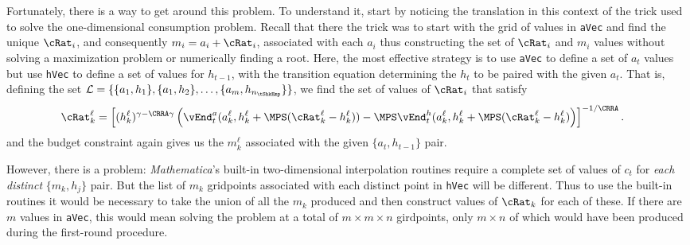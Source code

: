 \documentclass[titlepage]{\econtex}
\newcommand{\Mma}{\textit{Mathematica}}
\begin{document}
{  Fortunately, there is a way to get around this problem.  To
  understand it, start by noticing the translation in this context of
  the trick used to solve the one-dimensional consumption problem.
  Recall that there the trick was to start with the grid of values in
  \texttt{aVec} and find the unique ${\cRat}_{i}$, and
  consequently ${m}_{i}={a}_{i}+{\cRat}_{i}$, associated with
  each ${a}_{i}$ thus constructing the set of ${\cRat}_{i}$ and
  ${m}_{i}$ values without solving a maximization problem or
  numerically finding a root.  Here, the most effective strategy is to
  use \texttt{aVec} to define a set of ${a}_{t}$ values but use
  \texttt{hVec} to define a set of values for $h_{t-1}$, with the
  transition equation determining the $h_{t}$ to be paired with the
  given ${a}_{t}$.  That is, defining the set $\mathcal{L} =
  \{\{{a}_{1},h_{1}\},\{{a}_{1},h_{2}\},\ldots,\{{a}_{m},h_{n_{\tShkEmp}}\}\}$,
  we find the set of values of ${\cRat}_{i}$ that satisfy
  \begin{equation}\begin{gathered}\begin{aligned}
    {\cRat}_{k}^{\ell}  & = \left[(h_{k}^{\ell})^{\gamma-\CRRA\gamma}
                             \left(\vEnd_{t}^{{a}}({a}_{k}^{\ell},h_{k}^{\ell}
                             +\MPS({\cRat}_{k}^{\ell}-h_{k}^{\ell}))
                             -\MPS
                             \vEnd_{t}^{h}({a}_{k}^{\ell},h_{k}^{\ell}+\MPS({\cRat}_{k}^{\ell}-h_{k}^{\ell})\right)
                             \right]^{-1/\CRRA}. \nonumber
  \end{aligned}\end{gathered}\end{equation}
  and the budget constraint again gives us the ${m}_{k}^{\ell}$
  associated with the given $\{{a}_{t},h_{t-1}\}$ pair.

  However, there is a problem: {\Mma}'s built-in two-dimensional
  interpolation routines require a complete set of values of ${c}_{t}$
  for \textit{each distinct} $\{{m}_{k},h_{j}\}$ pair.  But the list of
  ${m}_{k}$ gridpoints associated with each distinct point in
  \texttt{hVec} will be different.  Thus to use the built-in routines
  it would be necessary to take the union of all the ${m}_{k}$
  produced and then construct values of ${\cRat}_{k}$ for each of
  these.  If there are $m$ values in \texttt{aVec}, this would
  mean solving the problem at a total of $m \times m \times n$
  girdpoints, only $m \times n$ of which would have been produced
  during the first-round procedure.

}
\end{document}
